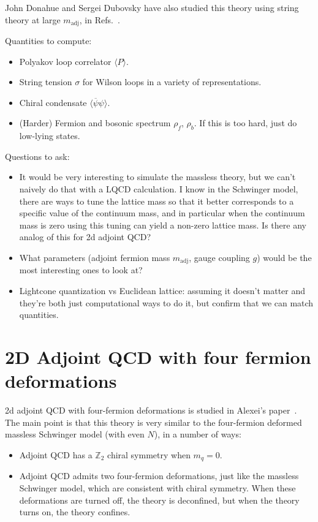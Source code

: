 John Donahue and Sergei Dubovsky have also studied this theory using string theory at large $m_\mathrm{adj}$, in Refs.~\cite{Donahue:2019adv,Donahue:2019fgn}. 

Quantities to compute:
\begin{itemize}
	\item Polyakov loop correlator $\langle P \rangle$. 
	\item String tension $\sigma$ for Wilson loops in a variety of representations.
	\item Chiral condensate $\langle\overline\psi\psi\rangle$.  
	\item (Harder) Fermion and bosonic spectrum $\rho_f$, $\rho_b$. If this is too hard, just do low-lying states. 
\end{itemize}

Questions to ask:
\begin{itemize}
	\item It would be very interesting to simulate the massless theory, but we can't naively do that with a LQCD calculation. I know in the Schwinger model, there are ways to tune the lattice mass so that it better corresponds to a specific value of the continuum mass, and in particular when the continuum mass is zero using this tuning can yield a non-zero lattice mass. Is there any analog of this for 2d adjoint QCD?
	\item What parameters (adjoint fermion mass $m_\mathrm{adj}$, gauge coupling $g$) would be the most interesting ones to look at?
	\item Lightcone quantization vs Euclidean lattice: assuming it doesn't matter and they're both just computational ways to do it, but confirm that we can match quantities. 
\end{itemize}

\section{2D Adjoint QCD with four fermion deformations}

2d adjoint QCD with four-fermion deformations is studied in Alexei's paper~\cite{Cherman:2019hbq}. The main point is that this theory is very similar to the four-fermion deformed massless Schwinger model (with even $N$), in a number of ways:
\begin{itemize}
	\item Adjoint QCD has a $\mathbb Z_2$ chiral symmetry when $m_q = 0$.
	\item Adjoint QCD admits two four-fermion deformations, just like the massless Schwinger model, which are consistent with chiral symmetry. When these deformations are turned off, the theory is deconfined, but when the theory turns on, the theory confines. 
\end{itemize}

